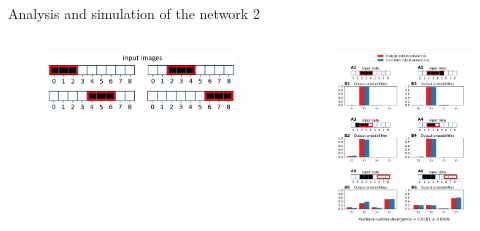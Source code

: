 \documentclass[aspectratio=169]{beamer}
\begin{document}
\begin{frame}{Analysis and
 simulation of the network 2}
 \vspace{-1.0cm}
   \begin{columns}
     \begin{column}{0.3\textwidth}
     	\begin{figure}
        \includegraphics[width=1\linewidth]{../Latex/figures/1D/4_1DInputImages.png}
      \end{figure}
     \end{column}
     \begin{column}{0.4\textwidth}
		\begin{figure}
        \includegraphics[width=0.75\linewidth]{../Latex/figures/1D/1D_98_440_4.png}
      \end{figure}
      \end{column}
    \end{columns} 
\end{frame}
\end{document}
